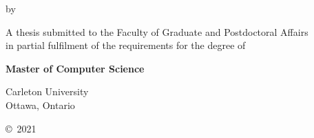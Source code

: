 \makeatletter
\begin{titlepage}
    \begin{center}
      \vspace*{1cm}
      {\LARGE\bfseries \@title}

      \vspace{1cm}
      by
      \vspace{1cm}

      {\itshape\large \@author\/}

      \vfill

      A thesis submitted to the Faculty of Graduate and Postdoctoral Affairs\\
      in partial fulfilment of the requirements for the degree of

      \vspace{1cm}
      {\bfseries Master of Computer Science}

      \vfill

      \vspace{1cm}
      {\@date}

      \vspace{1cm}
      Carleton University\\
      Ottawa, Ontario
      \vspace{1cm}

      \copyright{}~2021 \@author%
    \end{center}
\end{titlepage}
\makeatother
